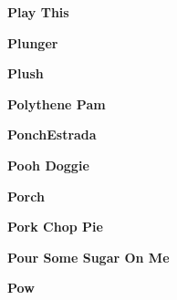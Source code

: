 \begin{center}\textbf{Play This}\end{center}
\newline
\vspace{10pt} 
\begin{center}\textbf{Plunger}\end{center}
\newline
\vspace{10pt} 
\begin{center}\textbf{Plush}\end{center}
\newline
\vspace{10pt} 
\begin{center}\textbf{Polythene Pam}\end{center}
\newline
\vspace{10pt} 
\begin{center}\textbf{PonchEstrada}\end{center}
\newline
\vspace{10pt} 
\begin{center}\textbf{Pooh Doggie}\end{center}
\newline
\vspace{10pt} 
\begin{center}\textbf{Porch}\end{center}
\newline
\vspace{10pt} 
\begin{center}\textbf{Pork Chop Pie}\end{center}
\newline
\vspace{10pt} 
\begin{center}\textbf{Pour Some Sugar On Me}\end{center}
\newline
\vspace{10pt} 
\begin{center}\textbf{Pow}\end{center}
\newline
